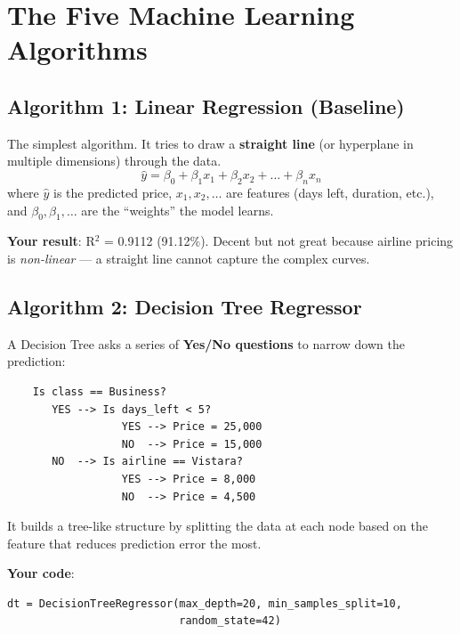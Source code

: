 \documentclass[12pt, a4paper]{article}
\begin{document}
\section{The Five Machine Learning Algorithms}

\subsection{Algorithm 1: Linear Regression (Baseline)}

\begin{conceptbox}
    The simplest algorithm. It tries to draw a \textbf{straight line} (or hyperplane in multiple dimensions) through the data.
    \[
        \hat{y} = \beta_0 + \beta_1 x_1 + \beta_2 x_2 + \ldots + \beta_n x_n
    \]
    where $\hat{y}$ is the predicted price, $x_1, x_2, \ldots$ are features (days left, duration, etc.), and $\beta_0, \beta_1, \ldots$ are the ``weights'' the model learns.
\end{conceptbox}

\textbf{Your result}: R$^2$ = 0.9112 (91.12\%). Decent but not great because airline pricing is \textit{non-linear} — a straight line cannot capture the complex curves.

\subsection{Algorithm 2: Decision Tree Regressor}

\begin{conceptbox}
    A Decision Tree asks a series of \textbf{Yes/No questions} to narrow down the prediction:

    \begin{verbatim}
    Is class == Business?
       YES --> Is days_left < 5?
                  YES --> Price = 25,000
                  NO  --> Price = 15,000
       NO  --> Is airline == Vistara?
                  YES --> Price = 8,000
                  NO  --> Price = 4,500
    \end{verbatim}

    It builds a tree-like structure by splitting the data at each node based on the feature that reduces prediction error the most.
\end{conceptbox}

\textbf{Your code}:
\begin{lstlisting}
dt = DecisionTreeRegressor(max_depth=20, min_samples_split=10,
                           random_state=42)
\end{lstlisting}
\end{document}
